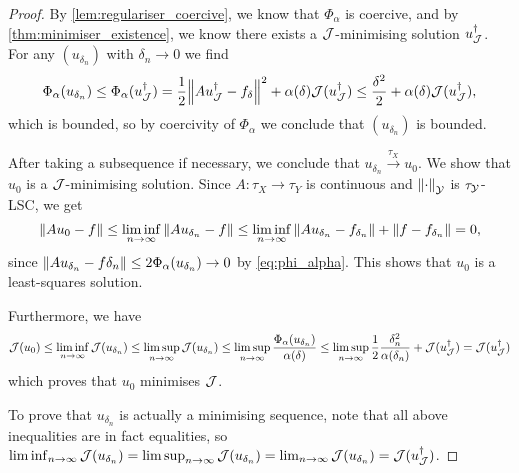 \begin{proof} 
	By \cref{lem:regulariser_coercive}, we know that $\Phi_\alpha$ is coercive, and by \cref{thm:minimiser_existence}, we know there exists a $\mathcal J$-minimising solution $u_\mathcal J^\dagger$. For any $(u_{\delta_n})$ with $\delta_n \to 0$ we find
	\begin{equation} \label{eq:phi_alpha}
	\Phi_\alpha(u_{\delta_n}) \leq \Phi_\alpha(u_\mathcal J^\dagger) = \frac12\norm{A u_\mathcal J^\dagger - f_\delta}^2 + \alpha(\delta) \mathcal J(u_\mathcal J^\dagger) \leq \frac{\delta^2}{2} + \alpha(\delta)\mathcal J(u_\mathcal J^\dagger),
	\end{equation}
	which is bounded, so by coercivity of $\Phi_\alpha$ we conclude that $(u_{\delta_n})$ is bounded. 
	
	After taking a subsequence if necessary, we conclude that $u_{\delta_n} \overset{\tau_X}\to u_0$. We show that $u_0$ is a $\mathcal J$-minimising solution. Since $A \colon \tau_X \to \tau_Y$ is continuous and $\norm{\cdot}_\mathcal Y$ is $\tau_\mathcal Y$-LSC, we get
	\[
	\norm{Au_0 - f} \leq \liminf_{n\to\infty} \norm{Au_{\delta_n} - f} \leq \liminf_{n\to\infty} \norm{Au_{\delta_n} - f_{\delta_n}} + \norm{f - f_{\delta_n}} = 0,
	\]
	since $\norm{Au_{\delta_n} - f\delta_n} \leq 2 \Phi_\alpha(u_{\delta_n}) \to 0$ by \cref{eq:phi_alpha}. This shows that $u_0$ is a least-squares solution.
	
	Furthermore, we have 
	\[
	\mathcal J(u_0) \leq \liminf_{n\to\infty} \mathcal J(u_{\delta_n}) \leq \limsup_{n\to\infty} \mathcal J(u_{\delta_n}) \leq \limsup_{n\to\infty} \frac{\Phi_\alpha(u_{\delta_n})}{\alpha(\delta)} \leq \limsup_{n\to\infty} \frac12 \frac{\delta_n^2}{\alpha(\delta_n)} + \mathcal J(u_\mathcal J^\dagger) = \mathcal J(u_\mathcal J^\dagger)
	\]
	which proves that $u_0$ minimises $\mathcal J$. 
	
	To prove that $u_{\delta_n}$ is actually a minimising sequence, note that all above inequalities are in fact equalities, so $\liminf_{n\to\infty} \mathcal J(u_{\delta_n}) = \limsup_{n\to\infty} \mathcal J(u_{\delta_n}) = \lim_{n\to\infty} \mathcal J(u_{\delta_n}) = \mathcal J(u_\mathcal J^\dagger)$.

%	
%	
\end{proof}

